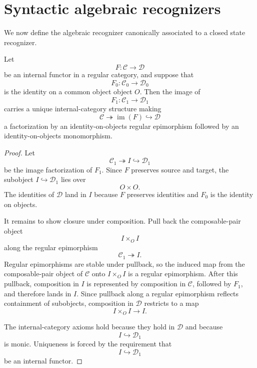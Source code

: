 \section{Syntactic algebraic recognizers}
\label{sec:eilenberg-syntactic-algebraic-recognizer}

We now define the algebraic recognizer canonically associated to a closed
state recognizer.

\begin{lemma}
\label{lem:image-identity-on-objects-functor}
Let
\[
F:\mathcal C\to\mathcal D
\]
be an internal functor in a regular category, and suppose that
\[
F_0:\mathcal C_0\to\mathcal D_0
\]
is the identity on a common object object \(O\). Then the image of
\[
F_1:\mathcal C_1\to\mathcal D_1
\]
carries a unique internal-category structure making
\[
\mathcal C
\twoheadrightarrow
\operatorname{im}(F)
\hookrightarrow
\mathcal D
\]
a factorization by an identity-on-objects regular epimorphism followed by an
identity-on-objects monomorphism.
\end{lemma}

\begin{proof}
Let
\[
\mathcal C_1\twoheadrightarrow I\hookrightarrow\mathcal D_1
\]
be the image factorization of \(F_1\). Since \(F\) preserves source and target,
the subobject \(I\hookrightarrow \mathcal D_1\) lies over
\[
O\times O.
\]
The identities of \(\mathcal D\) land in \(I\) because \(F\) preserves
identities and \(F_0\) is the identity on objects.

It remains to show closure under composition. Pull back the composable-pair
object
\[
I\times_{O}I
\]
along the regular epimorphism
\[
\mathcal C_1\twoheadrightarrow I.
\]
Regular epimorphisms are stable under pullback, so the induced map from the
composable-pair object of \(\mathcal C\) onto \(I\times_O I\) is a regular
epimorphism. After this pullback, composition in \(I\) is represented by
composition in \(\mathcal C\), followed by \(F_1\), and therefore lands in
\(I\). Since pullback along a regular epimorphism reflects containment of
subobjects, composition in \(\mathcal D\) restricts to a map
\[
I\times_O I\to I.
\]

The internal-category axioms hold because they hold in \(\mathcal D\) and
because
\[
I\hookrightarrow \mathcal D_1
\]
is monic. Uniqueness is forced by the requirement that
\[
I\hookrightarrow\mathcal D_1
\]
be an internal functor.
\end{proof}

